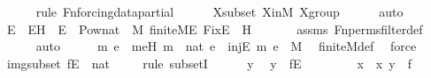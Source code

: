 \begin{isabellebody}
\ \ \ \ \ \isamarkupfalse%
{\isacharparenleft}{\kern0pt}rule\ Fn{\isacharunderscore}{\kern0pt}forcing{\isacharunderscore}{\kern0pt}data{\isacharunderscore}{\kern0pt}partial{\isacharparenright}{\kern0pt}\isanewline
\ \ \ \ \isamarkupfalse%
\ Xsubset\ XinM\ Xgroup\isanewline
\ \ \ \ \isamarkupfalse%
\ auto\isanewline
\isanewline
\ \ \isamarkupfalse%
\ E\ \ EH\ {\isacharcolon}{\kern0pt}\ {\isachardoublequoteopen}E\ {\isasymin}\ Pow{\isacharparenleft}{\kern0pt}nat{\isacharparenright}{\kern0pt}\ {\isasyminter}\ M{\isachardoublequoteclose}\ {\isachardoublequoteopen}finite{\isacharunderscore}{\kern0pt}M{\isacharparenleft}{\kern0pt}E{\isacharparenright}{\kern0pt}{\isachardoublequoteclose}\ {\isachardoublequoteopen}Fix{\isacharparenleft}{\kern0pt}E{\isacharparenright}{\kern0pt}\ {\isasymsubseteq}\ H{\isachardoublequoteclose}\ \isanewline
\ \ \ \ \isamarkupfalse%
\ assms\ Fn{\isacharunderscore}{\kern0pt}perms{\isacharunderscore}{\kern0pt}filter{\isacharunderscore}{\kern0pt}def\isanewline
\ \ \ \ \isamarkupfalse%
\ auto\isanewline
\isanewline
\ \ \isamarkupfalse%
\ \isamarkupfalse%
\ m\ e\ \ meH{\isacharcolon}{\kern0pt}\ {\isachardoublequoteopen}m\ {\isasymin}\ nat{\isachardoublequoteclose}\ {\isachardoublequoteopen}e\ {\isasymin}\ inj{\isacharparenleft}{\kern0pt}E{\isacharcomma}{\kern0pt}\ m{\isacharparenright}{\kern0pt}{\isachardoublequoteclose}\ {\isachardoublequoteopen}e\ {\isasymin}\ M{\isachardoublequoteclose}\ \isamarkupfalse%
\ finite{\isacharunderscore}{\kern0pt}M{\isacharunderscore}{\kern0pt}def\ \isamarkupfalse%
\ force\isanewline
\isanewline
\ \ \isamarkupfalse%
\ imgsubset{\isacharcolon}{\kern0pt}\ {\isachardoublequoteopen}f{\isacharbackquote}{\kern0pt}{\isacharbackquote}{\kern0pt}E\ {\isasymsubseteq}\ nat{\isachardoublequoteclose}\ \isanewline
\ \ \isamarkupfalse%
\ {\isacharparenleft}{\kern0pt}rule\ subsetI{\isacharparenright}{\kern0pt}\isanewline
\ \ \ \ \isamarkupfalse%
\ y\ \isamarkupfalse%
\ {\isachardoublequoteopen}y\ {\isasymin}\ f{\isacharbackquote}{\kern0pt}{\isacharbackquote}{\kern0pt}E{\isachardoublequoteclose}\ \isanewline
\ \ \ \ \isamarkupfalse%
\ \isamarkupfalse%
\ x\ \ {\isachardoublequoteopen}{\isacharless}{\kern0pt}x{\isacharcomma}{\kern0pt}\ y{\isachargreater}{\kern0pt}\ {\isasymin}\ f{\isachardoublequoteclose}\ \isamarkupfalse%

\end{isabellebody}
